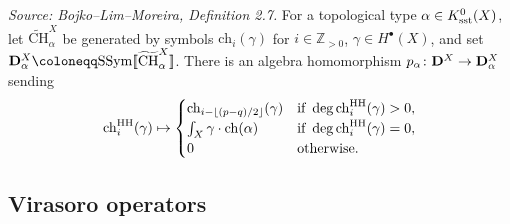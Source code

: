 \begin{definition}[TopDescendentAlgebra]
  \label{def:topological-descendent-algebra}
  \textit{Source: Bojko--Lim--Moreira, Definition 2.7.}
  For a topological type \(\alpha \in K^0_{\mathrm{sst}}(X)\), let
  \(\widetilde{\mathrm{CH}}^X_\alpha\) be generated by symbols
  \(\mathrm{ch}_i(\gamma)\) for \(i \in \mathbb{Z}_{>0}\), \(\gamma \in H^\bullet(X)\),
  and set \(\BD^X_\alpha \coloneqq \SSym\llbracket \widetilde{\mathrm{CH}}^X_\alpha \rrbracket\).
  There is an algebra homomorphism \(p_\alpha \colon \mathbf{D}^X \to \mathbf{D}^X_\alpha\) sending
  \[\mathrm{ch}^{\mathrm{HH}}_i(\gamma) \mapsto \begin{cases}
    \mathrm{ch}_{i - \lfloor (p-q)/2 \rfloor}(\gamma)
      & \text{if } \deg \mathrm{ch}^{\mathrm{HH}}_i(\gamma) > 0, \\
    \int_X \gamma \cdot \mathrm{ch}(\alpha)
      & \text{if } \deg \mathrm{ch}^{\mathrm{HH}}_i(\gamma) = 0, \\
    0 & \text{otherwise.}
  \end{cases}\]
\end{definition}

\subsection{Virasoro operators}


